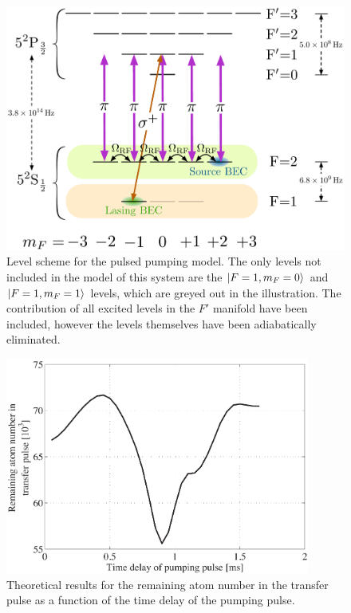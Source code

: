 \begin{figure}
    \centering
    \includegraphics[width=12cm]{PulsedPumpingLevelDiagram}
    \caption{Level scheme for the pulsed pumping model.  The only levels not included in the model of this system are the ${\left|F=1, m_F=0\right>}$ and ${\left|F=1, m_F=1\right>}$ levels, which are greyed out in the illustration.  The contribution of all excited levels in the $F'$ manifold have been included, however the levels themselves have been adiabatically eliminated.}
    \label{OpticalPumping:PulsedPumpingLevelDiagram}
\end{figure}

\begin{figure}
    \centering
    \includegraphics[width=10cm]{PulsedPumpingTheoryTransferPulseNumber}
    \caption{Theoretical results for the remaining atom number in the transfer pulse as a function of the time delay of the pumping pulse.}
    \label{OpticalPumping:PulsedPumpingTheoryTransferPulseNumber}
\end{figure}

